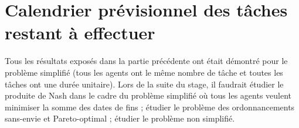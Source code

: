 \documentclass[12pt]{article}
\theoremstyle{definition}
\begin{document}
\section{Calendrier prévisionnel des tâches restant à effectuer}
\noindent
Tous les résultats exposés dans la partie précédente ont était démontré pour le problème simplifié (tous les agents ont le même nombre de tâche et toutes les tâches ont une durée unitaire). Lors de la suite du stage, il faudrait étudier le produite de Nash dans le cadre du problème simplifié où tous les agents veulent minimiser la somme des dates de fins ; étudier le problème des ordonnancements sans-envie et Pareto-optimal ; étudier le problème non simplifié.
\end{document}
